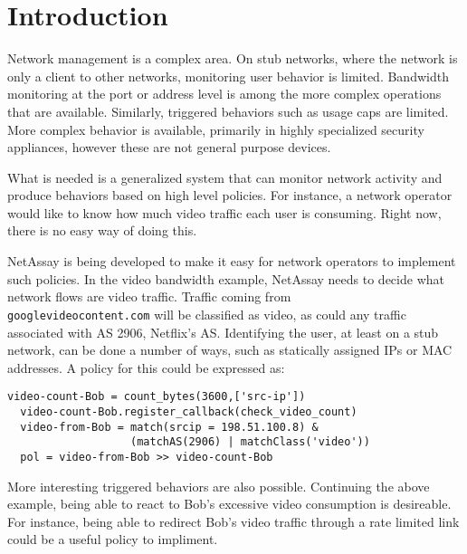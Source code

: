 \documentclass{sig-alternate}
\newcommand\tti[1]{\small\texttt{#1}\normalsize}
\newcommand\system{NetAssay}
\begin{document}



\section{Introduction}
Network management is a complex area. On stub networks, where the network is only a client to other networks, monitoring user behavior is limited. Bandwidth monitoring at the port or address level is among the more complex operations that are available. Similarly, triggered behaviors such as usage caps are limited. 
More complex behavior is available, primarily in highly specialized security appliances, however these are not general purpose devices.

What is needed is a generalized system that can monitor network activity and produce behaviors based on high level policies. For instance, a network operator would like to know how much video traffic each user is consuming. Right now, there is no easy way of doing this. 

\system{} is being developed to make it easy for network operators to implement such policies. In the video bandwidth example, \system{} needs to decide what network flows are video traffic. Traffic coming from \\\tti{googlevideocontent.com} will be classified as video, as could any traffic associated with AS 2906, Netflix's AS. Identifying the user, at least on a stub network, can be done a number of ways, such as statically assigned IPs or MAC addresses. A policy for this could be expressed as:

\begin{Verbatim}[fontsize=\small]
  video-count-Bob = count_bytes(3600,['src-ip'])
  video-count-Bob.register_callback(check_video_count)
  video-from-Bob = match(srcip = 198.51.100.8) & 
                   (matchAS(2906) | matchClass('video'))
  pol = video-from-Bob >> video-count-Bob
\end{Verbatim}
  

More interesting triggered behaviors are also possible. Continuing the above example, being able to react to Bob's excessive video consumption is desireable. For instance, being able to redirect Bob's video traffic through a rate limited link could be a useful policy to impliment. 
\end{document}
